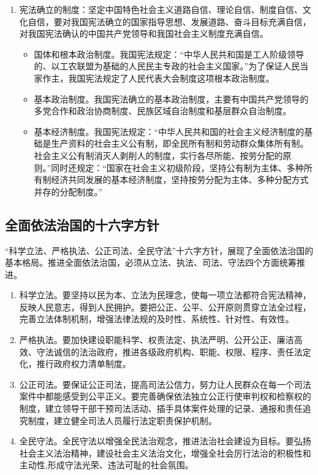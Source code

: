 \begin{enumerate}
\item 宪法确立的制度：坚定中国特色社会主义道路自信、理论自信、制度自信、文化自信，要对我国宪法确立的国家指导思想、发展道路、奋斗目标充满自信，对我国宪法确认的中国共产党领导和我国社会主义制度充满自信。
\begin{itemize}
\item 国体和根本政治制度。我国宪法规定：“中华人民共和国是工人阶级领导的、以工农联盟为基础的人民民主专政的社会主义国家。”为了保证人民当家作主，我国宪法规定了人民代表大会制度这项根本政治制度。
\item 基本政治制度。我国宪法确立的基本政治制度，主要有中国共产党领导的多党合作和政治协商制度、民族区域自治制度和基层群众自治制度。
\item 基本经济制度。我国宪法规定：“中华人民共和国的社会主义经济制度的基础是生产资料的社会主义公有制，即全民所有制和劳动群众集体所有制。社会主义公有制消灭人剥削人的制度，实行各尽所能、按劳分配的原则。”同时还规定：“国家在社会主义初级阶段，坚持公有制为主体、多种所有制经济共同发展的基本经济制度，坚持按劳分配为主体、多种分配方式并存的分配制度。”
\end{itemize}
\end{enumerate}

\subsection{全面依法治国的十六字方针}
“科学立法、严格执法、公正司法、全民守法”十六字方针，展现了全面依法治国的基本格局。推进全面依法治国，必须从立法、执法、司法、守法四个方面统筹推进。
\begin{enumerate}
\item 科学立法。要坚持以民为本、立法为民理念，使每一项立法都符合宪法精神，反映人民意志，得到人民拥护。要把公正、公平、公开原则贯穿立法全过程，完善立法体制机制，增强法律法规的及时性、系统性、针对性、有效性。
\item 严格执法。要加快建设职能科学、权责法定、执法严明、公开公正、廉洁高效、守法诚信的法治政府，推进各级政府机构、职能、权限、程序、责任法定化，推行政府权力清单制度。
\item 公正司法。要保证公正司法，提高司法公信力，努力让人民群众在每一个司法案件中都能感受到公平正义。要完善确保依法独立公正行使审判权和检察权的制度，建立领导干部干预司法活动、插手具体案件处理的记录、通报和责任追究制度，建立健全司法人员履行法定职责保护机制。
\item 全民守法。全民守法以增强全民法治观念，推进法治社会建设为目标。要弘扬社会主义法治精神，建设社会主义法治文化，增强全社会厉行法治的积极性和主动性,形成守法光荣、违法可耻的社会氛围。
\end{enumerate}

